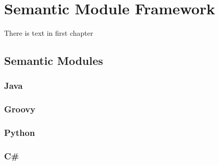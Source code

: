 \chapter{Semantic Module Framework}
There is text in first chapter

\section{Semantic Modules}

\subsection{Java}

\subsection{Groovy}

\subsection{Python}

\subsection{C\#}


